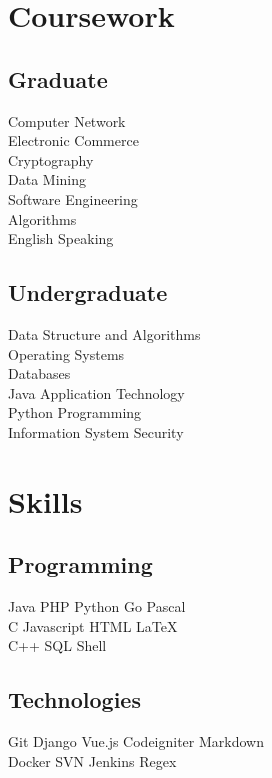 \documentclass[]{deedy-resume-openfont}
\begin{document}
\begin{minipage}[t]{0.25\textwidth}
\section{Coursework}
\subsection{Graduate}
Computer Network \\
Electronic Commerce \\
Cryptography \\
Data Mining \\
Software Engineering \\
Algorithms \\
English Speaking \\ 
\sectionsep

\subsection{Undergraduate}
Data Structure and Algorithms \\
Operating Systems \\ 
Databases \\
Java Application Technology \\
Python Programming \\
Information System Security


\section{Skills}
\sectionsep
\subsection{Programming}
Java \textbullet{} PHP \textbullet{} Python \textbullet{} Go \textbullet{} Pascal\\
C \textbullet{} Javascript \textbullet{} HTML \textbullet{} \LaTeX\ \\
C++ \textbullet{} SQL \textbullet{} Shell \\ 
\sectionsep

\subsection{Technologies}
Git \textbullet{} Django \textbullet{} Vue.js \textbullet{} Codeigniter \textbullet{} Markdown \\
Docker  \textbullet{} SVN \textbullet{} Jenkins \textbullet{} Regex\\
\sectionsep


\end{minipage}
\end{document}
